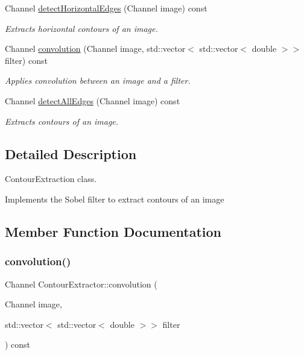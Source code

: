 \begin{DoxyCompactItemize}
Channel \hyperlink{class_contour_extractor_af99fc045e0745f2b4244ad43822a7a1d}{detect\+Horizontal\+Edges} (Channel image) const
\begin{DoxyCompactList}\small\item\em Extracts horizontal contours of an image. \end{DoxyCompactList}\item 
Channel \hyperlink{class_contour_extractor_a4a8d3597e99dcc90a62cb493bed0795d}{convolution} (Channel image, std\+::vector$<$ std\+::vector$<$ double $>$$>$ filter) const
\begin{DoxyCompactList}\small\item\em Applies convolution between an image and a filter. \end{DoxyCompactList}\item 
Channel \hyperlink{class_contour_extractor_a0f85a3798530781e5c20b845df1677eb}{detect\+All\+Edges} (Channel image) const
\begin{DoxyCompactList}\small\item\em Extracts contours of an image. \end{DoxyCompactList}\end{DoxyCompactItemize}


\subsection{Detailed Description}
Contour\+Extraction class. 

Implements the Sobel filter to extract contours of an image 

\subsection{Member Function Documentation}
\mbox{\label{class_contour_extractor_a4a8d3597e99dcc90a62cb493bed0795d}} 
\subsubsection{\texorpdfstring{convolution()}{convolution()}}
{\footnotesize\ttfamily Channel Contour\+Extractor\+::convolution (\begin{DoxyParamCaption}\item[{Channel}]{image,  }\item[{std\+::vector$<$ std\+::vector$<$ double $>$$>$}]{filter }\end{DoxyParamCaption}) const}



